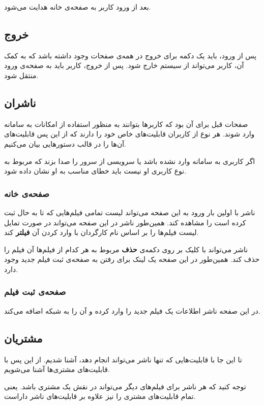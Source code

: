 \documentclass{utap}
\begin{document}
	بعد از ورود کاربر به صفحه‌ی خانه هدایت می‌شود.

	
	\subsection{خروج}
	پس از ورود، باید یک دکمه برای خروج در همه‌ی صفحات وجود داشته باشد که به کمک آن، کاربر می‌تواند از سیستم خارج شود. پس از خروج، کاربر باید به صفحه‌ی ورود منتقل شود.
	
	
	
	\subsection{ناشران}
	صفحات قبل برای آن بود که کاربر‌ها بتوانند به منظور استفاده از امکانات به سامانه‌ وارد شوند. هر نوع از کاربران قابلیت‌های خاص خود  را دارند که از این پس قابلیت‌های آن‌ها را در قالب دستورهایی بیان می‌کنیم.
	
		اگر کاربری به سامانه وارد نشده باشد یا سرویسی از سرور را صدا بزند که مربوط به نوع کاربری او نیست باید خطای مناسب به او نشان داده شود.
		
		\subsubsection{صفحه‌ی خانه} 
		ناشر با اولین بار ورود به این صفحه می‌تواند لیست تمامی فیلم‌هایی که تا به حال ثبت کرده است را مشاهده کند. همین‌طور ناشر در این صفحه می‌تواند در صورت تمایل لیست‌ فیلم‌ها را بر اساس نام کارگردان با وارد کردن آن \textbf{فیلتر} کند. 
		
		
		ناشر می‌تواند با کلیک بر روی دکمه‌ی \textbf{حذف} مربوط به هر کدام از فیلم‌ها آن فیلم را حذف کند. 
		همین‌طور در این صفحه یک لینک برای رفتن به صفحه‌ی ثبت فیلم جدید وجود دارد.
		
		 \subsubsection{صفحه‌ی ثبت فیلم}
	در این صفحه ناشر اطلاعات یک فیلم جدید را وارد کرده و آن را به شبکه اضافه می‌کند.   
	
	\subsection{مشتریان}
	تا این جا با قابلیت‌هایی که تنها ناشر می‌تواند انجام دهد، آشنا شدیم.
	از این پس با قابلیت‌های مشتری‌ها آشنا می‌شویم.
	
	توجه کنید که هر ناشر برای فیلم‌های دیگر می‌تواند در نقش یک مشتری باشد.
	یعنی تمام قابلیت‌های مشتری را نیز علاوه بر قابلیت‌های ناشر داراست.
	
\end{document}
